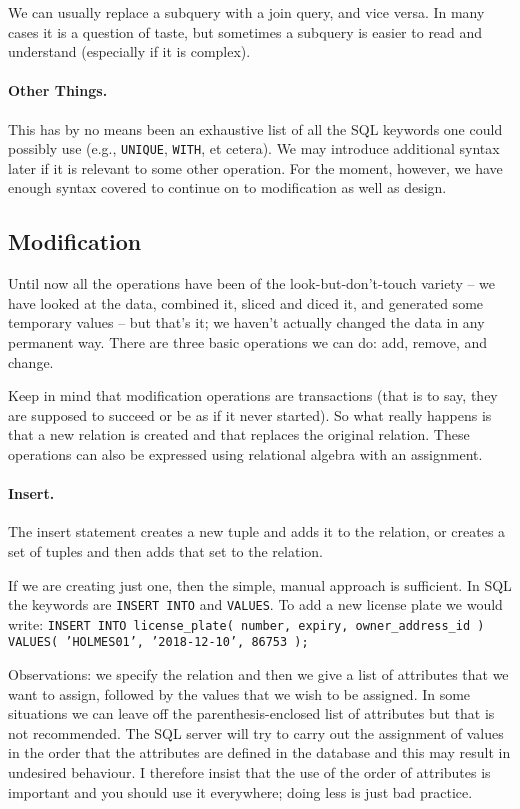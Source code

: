 \documentclass[a4paper]{report}
\begin{document}
We can usually replace a subquery with a join query, and vice versa. In many cases it is a question of taste, but sometimes a subquery is easier to read and understand (especially if it is complex). 

\paragraph{Other Things.}
This has by no means been an exhaustive list of all the SQL keywords one could possibly use (e.g., \texttt{UNIQUE}, \texttt{WITH}, et cetera). We may introduce additional syntax later if it is relevant to some other operation. For the moment, however, we have enough syntax covered to continue on to modification as well as design. 

\subsection*{Modification}

Until now all the operations have been of the look-but-don't-touch variety -- we have looked at the data, combined it, sliced and diced it, and generated some temporary values -- but that's it; we haven't actually changed the data in any permanent way. There are three basic operations we can do: add, remove, and change.

Keep in mind that modification operations are transactions (that is to say, they are supposed to succeed or be as if it never started). So what really happens is that a new relation is created and that replaces the original relation. These operations can also be expressed using relational algebra with an assignment. 



\paragraph{Insert.}

The insert statement creates a new tuple and adds it to the relation, or creates a set of tuples and then adds that set to the relation.

If we are creating just one, then the simple, manual approach is sufficient. In SQL the keywords are \texttt{INSERT INTO} and \texttt{VALUES}. To add a new license plate we would write: \texttt{INSERT INTO license\_plate( number, expiry, owner\_address\_id ) VALUES( 'HOLMES01', '2018-12-10', 86753 );} 

Observations: we specify the relation and then we give a list of attributes that we want  to assign, followed by the values that we wish to be assigned. In some situations we can leave off the parenthesis-enclosed list of attributes but that is not recommended. The SQL server will try to carry out the assignment of values in the order that the attributes are defined in the database and this may result in undesired behaviour. I therefore insist that the use of the order of attributes is important and you should use it everywhere; doing less is just bad practice. 
\end{document}
